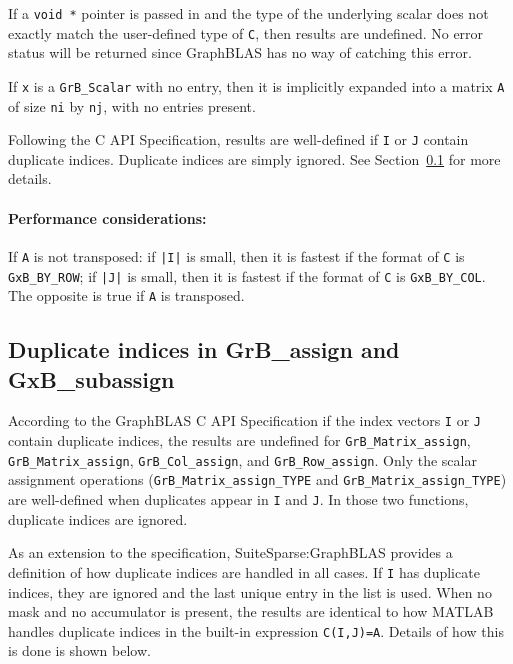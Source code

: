 \documentclass[12pt]{article}
\begin{document}
If a \verb'void *' pointer is passed in and the type of the underlying scalar
does not exactly match the user-defined type of \verb'C', then results are
undefined.  No error status will be returned since GraphBLAS has no way of
catching this error.

If \verb'x' is a \verb'GrB_Scalar' with no entry, then it is implicitly
expanded into a matrix \verb'A' of size \verb'ni' by \verb'nj', with no entries
present.

Following the C API Specification, results are well-defined if \verb'I' or
\verb'J' contain duplicate indices.  Duplicate indices are simply ignored.  See
Section~\ref{duplicates} for more details.

\paragraph{\bf Performance considerations:} %
If \verb'A' is not transposed: if \verb'|I|' is small, then it is fastest if
the format of \verb'C' is \verb'GxB_BY_ROW'; if \verb'|J|' is small, then it is
fastest if the format of \verb'C' is \verb'GxB_BY_COL'.  The opposite is true
if \verb'A' is transposed.

\newpage
\subsection{Duplicate indices in {\sf GrB\_assign} and {\sf GxB\_subassign}}
\label{duplicates}

According to the GraphBLAS C API Specification if the index vectors \verb'I' or
\verb'J' contain duplicate indices, the results are undefined for
\verb'GrB_Matrix_assign', \verb'GrB_Matrix_assign', \verb'GrB_Col_assign', and
\verb'GrB_Row_assign'.  Only the scalar assignment operations
(\verb'GrB_Matrix_assign_TYPE' and \verb'GrB_Matrix_assign_TYPE') are
well-defined when duplicates appear in \verb'I' and \verb'J'.  In those two
functions, duplicate indices are ignored.

As an extension to the specification, SuiteSparse:GraphBLAS provides a
definition of how duplicate indices are handled in all cases.  If \verb'I' has
duplicate indices, they are ignored and the last unique entry in the list is
used.  When no mask and no accumulator is present, the results are identical to
how MATLAB handles duplicate indices in the built-in expression
\verb'C(I,J)=A'.  Details of how this is done is shown below.
\end{document}
